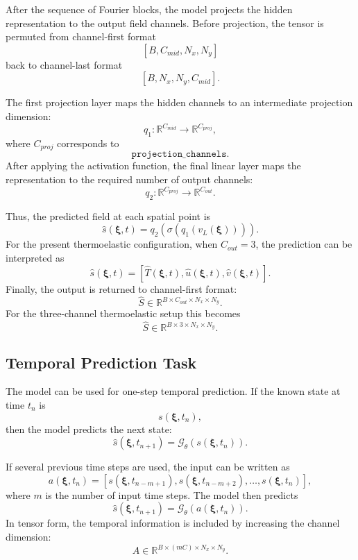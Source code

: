 \documentclass[14pt]{extarticle}
\begin{document}
After the sequence of Fourier blocks, the model projects the hidden representation to the output field channels. Before projection, the tensor is permuted from channel-first format
\[
[B, C_{mid}, N_x, N_y]
\]
back to channel-last format
\[
[B, N_x, N_y, C_{mid}].
\]

The first projection layer maps the hidden channels to an intermediate projection dimension:
\[
q_1:
\mathbb{R}^{C_{mid}}
\rightarrow
\mathbb{R}^{C_{proj}},
\]
where \(C_{proj}\) corresponds to
\[
\texttt{projection\_channels}.
\]
After applying the activation function, the final linear layer maps the representation to the required number of output channels:
\[
q_2:
\mathbb{R}^{C_{proj}}
\rightarrow
\mathbb{R}^{C_{out}}.
\]

Thus, the predicted field at each spatial point is
\[
\hat{s}(\boldsymbol{\xi}, t)
=
q_2
\left(
\sigma
\left(
q_1(v_L(\boldsymbol{\xi}))
\right)
\right).
\]
For the present thermoelastic configuration, when \(C_{out}=3\), the prediction can be interpreted as
\[
\hat{s}(\boldsymbol{\xi}, t)
=
\left[
\hat{T}(\boldsymbol{\xi}, t),
\hat{u}(\boldsymbol{\xi}, t),
\hat{v}(\boldsymbol{\xi}, t)
\right].
\]
Finally, the output is returned to channel-first format:
\[
\hat{S}
\in
\mathbb{R}^{B \times C_{out} \times N_x \times N_y}.
\]
For the three-channel thermoelastic setup this becomes
\[
\hat{S}
\in
\mathbb{R}^{B \times 3 \times N_x \times N_y}.
\]

\subsection{Temporal Prediction Task}

The model can be used for one-step temporal prediction. If the known state at time \(t_n\) is
\[
s(\boldsymbol{\xi}, t_n),
\]
then the model predicts the next state:
\[
\hat{s}(\boldsymbol{\xi}, t_{n+1})
=
\mathcal{G}_{\theta}
\left(
s(\boldsymbol{\xi}, t_n)
\right).
\]

If several previous time steps are used, the input can be written as
\[
a(\boldsymbol{\xi}, t_n)
=
\left[
s(\boldsymbol{\xi}, t_{n-m+1}),
s(\boldsymbol{\xi}, t_{n-m+2}),
\ldots,
s(\boldsymbol{\xi}, t_n)
\right],
\]
where \(m\) is the number of input time steps. The model then predicts
\[
\hat{s}(\boldsymbol{\xi}, t_{n+1})
=
\mathcal{G}_{\theta}
\left(
a(\boldsymbol{\xi}, t_n)
\right).
\]
In tensor form, the temporal information is included by increasing the channel dimension:
\[
A
\in
\mathbb{R}^{B \times (mC) \times N_x \times N_y}.
\]
\end{document}
